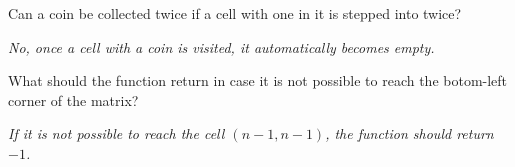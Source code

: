 \begin{QandA}
	\item \begin{questionitem} \begin{question} Can a coin be collected twice if a cell with one in it is stepped into twice?  \end{question} 	 
    \begin{answered}
		\textit{No, once a cell with a coin is visited, it automatically becomes empty.}
	\end{answered} \end{questionitem}

	\item \begin{questionitem} \begin{question} What should the function return in case it is not possible to reach the botom-left corner of the matrix?   \end{question} 	 
		\begin{answered}
			\textit{If it is not possible to reach the cell $(n-1,n-1)$, the function should return $-1$.}
		\end{answered} \end{questionitem}
	

\end{QandA}


